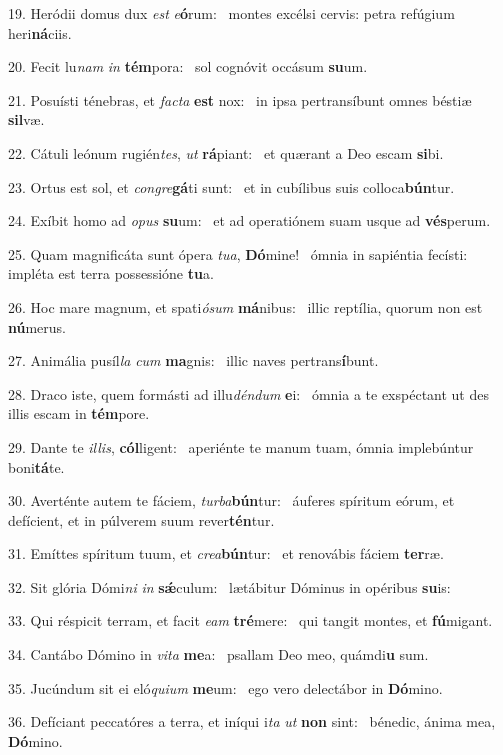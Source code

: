 19. Heródii domus dux \textit{est} \textit{e}\textbf{ó}rum: \ast\  montes excélsi cervis: petra refúgium heri\textbf{ná}ciis.\

20. Fecit lu\textit{nam} \textit{in} \textbf{tém}pora: \ast\  sol cognóvit occásum \textbf{su}um.\

21. Posuísti ténebras, et \textit{fac}\textit{ta} \textbf{est} nox: \ast\  in ipsa pertransíbunt omnes béstiæ \textbf{sil}væ.\

22. Cátuli leónum rugién\textit{tes}, \textit{ut} \textbf{rá}piant: \ast\  et quærant a Deo escam \textbf{si}bi.\

23. Ortus est sol, et \textit{con}\textit{gre}\textbf{gá}ti sunt: \ast\  et in cubílibus suis colloca\textbf{bún}tur.\

24. Exíbit homo ad \textit{o}\textit{pus} \textbf{su}um: \ast\  et ad operatiónem suam usque ad \textbf{vés}perum.\

25. Quam magnificáta sunt ópera \textit{tu}\textit{a}, \textbf{Dó}mine! \ast\  ómnia in sapiéntia fecísti: impléta est terra possessióne \textbf{tu}a.\

26. Hoc mare magnum, et spati\textit{ó}\textit{sum} \textbf{má}nibus: \ast\  illic reptília, quorum non est \textbf{nú}merus.\

27. Animália pusíl\textit{la} \textit{cum} \textbf{ma}gnis: \ast\  illic naves pertrans\textbf{í}bunt.\

28. Draco iste, quem formásti ad illu\textit{dén}\textit{dum} \textbf{e}i: \ast\  ómnia a te exspéctant ut des illis escam in \textbf{tém}pore.\

29. Dante te \textit{il}\textit{lis}, \textbf{cól}ligent: \ast\  aperiénte te manum tuam, ómnia implebúntur boni\textbf{tá}te.\

30. Averténte autem te fáciem, \textit{tur}\textit{ba}\textbf{bún}tur: \ast\  áuferes spíritum eórum, et defícient, et in púlverem suum rever\textbf{tén}tur.\

31. Emíttes spíritum tuum, et \textit{cre}\textit{a}\textbf{bún}tur: \ast\  et renovábis fáciem \textbf{ter}ræ.\

32. Sit glória Dómi\textit{ni} \textit{in} \textbf{sǽ}culum: \ast\  lætábitur Dóminus in opéribus \textbf{su}is:\

33. Qui réspicit terram, et facit \textit{e}\textit{am} \textbf{tré}mere: \ast\  qui tangit montes, et \textbf{fú}migant.\

34. Cantábo Dómino in \textit{vi}\textit{ta} \textbf{me}a: \ast\  psallam Deo meo, quámdi\textbf{u} sum.\

35. Jucúndum sit ei eló\textit{qui}\textit{um} \textbf{me}um: \ast\  ego vero delectábor in \textbf{Dó}mino.\

36. Defíciant peccatóres a terra, et iníqui i\textit{ta} \textit{ut} \textbf{non} sint: \ast\  bénedic, ánima mea, \textbf{Dó}mino.\

